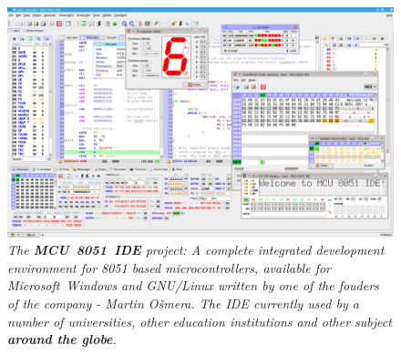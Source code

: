 \documentclass[a4paper,twoside,15pt]{book}
\begin{document}
		\begin{figure}[h!]
			\centering{}
			\includegraphics[width=.9\textwidth]{images/mcu8051ide_0.png}
			\caption{\textit{The \textbf{MCU~8051~IDE} project: A complete integrated development environment for 8051 based microcontrollers, available for Microsoft\textregistered{}~Windows\textregistered{} and GNU/Linux\textregistered{} written by one of the fouders of the company - Martin Ošmera. The IDE currently used by a number of universities, other education institutions and other subject \textbf{around the globe}.}}
		\end{figure}
\end{document}
